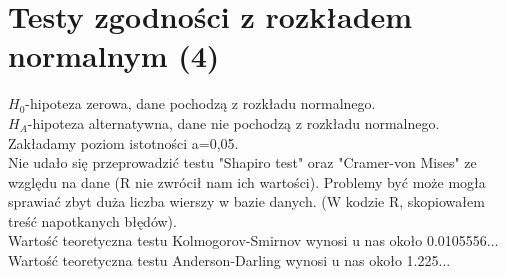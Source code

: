\documentclass[12pt]{article}
\begin{document}
	\section{Testy zgodności z rozkładem normalnym (4)}
	
	\(H_0\)-hipoteza zerowa, dane pochodzą z rozkładu normalnego.\\
	\(H_A\)-hipoteza alternatywna, dane nie pochodzą z rozkładu normalnego.\\
Zakładamy poziom istotności a=0,05.\\
		Nie udało się przeprowadzić testu "Shapiro test" oraz "Cramer-von Mises" ze względu na dane (R nie zwrócił nam ich wartości). Problemy być może mogła sprawiać zbyt duża liczba wierszy w bazie danych. (W kodzie R, skopiowałem treść napotkanych błędów).\\
	Wartość teoretyczna testu Kolmogorov-Smirnov wynosi u nas około 0.0105556...\\ 
	Wartość teoretyczna testu Anderson-Darling wynosi u nas około 1.225...\\ 
\end{document}
